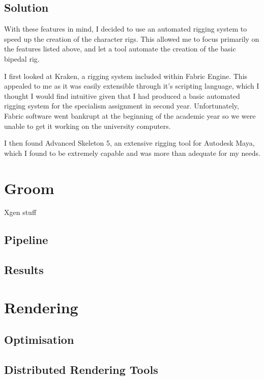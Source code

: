 \documentclass[11pt]{article}
\begin{document}
\subsection{Solution}

With these features in mind, I decided to use an automated rigging system to speed up the creation of the character rigs. This allowed me to focus primarily on the features listed above, and let a tool automate the creation of the basic bipedal rig.

I first looked at Kraken\cite{kraken}, a rigging system included within Fabric Engine. This appealed to me as it was easily extensible through it's scripting language, which I thought I would find intuitive given that I had produced a basic automated rigging system for the specialism assignment in second year. Unfortunately, Fabric software went bankrupt at the beginning of the academic year so we were unable to get it working on the university computers.

I then found Advanced Skeleton 5\cite{advancedSkeleton}, an extensive rigging tool for Autodesk Maya, which I found to be extremely capable and was more than adequate for my needs.

\section{Groom}

Xgen stuff

\subsection{Pipeline}

\subsection{Results}

\section{Rendering}

\subsection{Optimisation}

\subsection{Distributed Rendering Tools}
\end{document}

